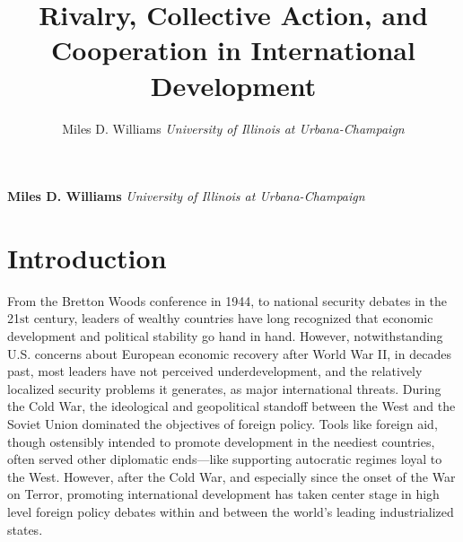 \documentclass[12pt,]{article}
\title{Rivalry, Collective Action, and Cooperation in International Development  }
\author{\Large Miles D. Williams\vspace{0.05in} \newline\normalsize\emph{University of Illinois at Urbana-Champaign}  }
\date{}
\newcommand*{\authorfont}{\fontfamily{phv}\selectfont}
\begin{document}
	
%

{%
\setlength{\parindent}{0pt}
\thispagestyle{plain}
{\fontsize{18}{20}\selectfont\raggedright 
\maketitle  %

}

{
   \vskip 13.5pt\relax \normalsize\fontsize{11}{12} 
\textbf{\authorfont Miles D. Williams} \hskip 15pt \emph{\small University of Illinois at Urbana-Champaign}   

}

}






\vskip -8.5pt



\noindent \doublespacing 

\hypertarget{introduction}{%
\section{Introduction}\label{introduction}}

From the Bretton Woods conference in 1944, to national security debates
in the 21\(\text{st}\) century, leaders of wealthy countries have long
recognized that economic development and political stability go hand in
hand. However, notwithstanding U.S. concerns about European economic
recovery after World War II, in decades past, most leaders have not
perceived underdevelopment, and the relatively localized security
problems it generates, as major international threats. During the Cold
War, the ideological and geopolitical standoff between the West and the
Soviet Union dominated the objectives of foreign policy. Tools like
foreign aid, though ostensibly intended to promote development in the
neediest countries, often served other diplomatic ends---like supporting
autocratic regimes loyal to the West. However, after the Cold War, and
especially since the onset of the War on Terror, promoting international
development has taken center stage in high level foreign policy debates
within and between the world's leading industrialized states.
\end{document}
